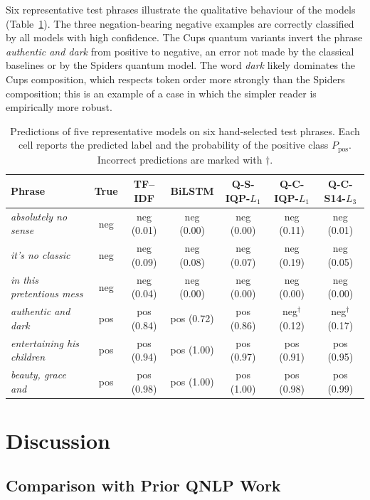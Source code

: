 \documentclass[11pt, a4paper]{article}
\begin{document}
Six representative test phrases illustrate the qualitative behaviour
of the models (Table~\ref{tab:samples}). The three negation-bearing
negative examples are correctly classified by all models with high
confidence. The Cups quantum variants invert the phrase
\emph{authentic and dark} from positive to negative, an error not
made by the classical baselines or by the Spiders quantum model. The
word \emph{dark} likely dominates the Cups composition, which
respects token order more strongly than the Spiders composition;
this is an example of a case in which the simpler reader is
empirically more robust.

\begin{table}[h!]
\centering
\caption{Predictions of five representative models on six hand-selected
test phrases. Each cell reports the predicted label and the probability
of the positive class \(P_{\text{pos}}\). Incorrect predictions are
marked with \(\dagger\).}
\label{tab:samples}
\footnotesize
\begin{tabular}{lcccccc}
\toprule
Phrase & True & TF--IDF & BiLSTM & Q-S-IQP-$L_1$ & Q-C-IQP-$L_1$ & Q-C-S14-$L_3$ \\
\midrule
\emph{absolutely no sense}     & neg & neg (0.01) & neg (0.00) & neg (0.00) & neg (0.11) & neg (0.01) \\
\emph{it's no classic}         & neg & neg (0.09) & neg (0.08) & neg (0.07) & neg (0.19) & neg (0.05) \\
\emph{in this pretentious mess}& neg & neg (0.04) & neg (0.00) & neg (0.00) & neg (0.00) & neg (0.00) \\
\emph{authentic and dark}      & pos & pos (0.84) & pos (0.72) & pos (0.86) & neg$^\dagger$ (0.12) & neg$^\dagger$ (0.17) \\
\emph{entertaining his children}& pos & pos (0.94) & pos (1.00) & pos (0.97) & pos (0.91) & pos (0.95) \\
\emph{beauty, grace and}       & pos & pos (0.98) & pos (1.00) & pos (1.00) & pos (0.98) & pos (0.99) \\
\bottomrule
\end{tabular}
\end{table}

\section{Discussion}
\label{sec:discussion}

\subsection{Comparison with Prior QNLP Work}
\end{document}
